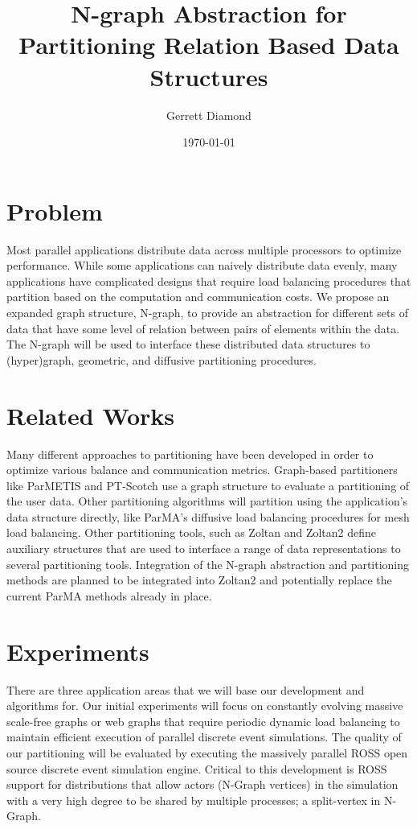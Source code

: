 \documentclass[a4paper]{article}
\title{N-graph Abstraction for Partitioning Relation Based Data Structures}
\author{Gerrett Diamond}
\date{\today}
\begin{document}
\maketitle

\section{Problem}
Most parallel applications distribute data across multiple processors to optimize performance. While some applications can naively distribute data evenly, many applications have complicated designs that require load balancing procedures that partition based on the computation and communication costs. We propose an expanded graph structure, N-graph, to provide an abstraction for different sets of data that have some level of relation between pairs of elements within the data. The N-graph will be used to interface these distributed data structures to (hyper)graph, geometric, and diffusive partitioning procedures. 

\section{Related Works}
Many different approaches to partitioning have been developed in order to optimize various balance and communication metrics. Graph-based partitioners like ParMETIS \cite{parmetis4} and PT-Scotch \cite{scotch2009} use a graph structure to evaluate a partitioning of the user data. Other partitioning algorithms will partition using the application's data structure directly, like ParMA's diffusive load balancing procedures \cite{Smith2015} for mesh load balancing. Other partitioning tools, such as Zoltan \cite{devine2002zoltan} and Zoltan2 \cite{zoltan2} define auxiliary structures that are used to interface a range of data representations to several partitioning tools. Integration of the N-graph abstraction and partitioning methods are planned to be integrated into Zoltan2 and potentially replace the current ParMA methods already in place.

\section{Experiments}
There are three application areas that we will base our development
and algorithms for. Our initial experiments will focus on
constantly evolving massive scale-free graphs or web graphs
that require periodic dynamic load balancing to maintain
efficient execution of parallel discrete event simulations. The
quality of our partitioning will be evaluated by executing the
massively parallel ROSS \cite{carothers2002ross} open source discrete event
simulation engine.  Critical to this development is ROSS support for distributions that allow actors (N-Graph vertices) in the simulation with a very high degree to be shared by multiple processes; a split-vertex in N-Graph. 
\end{document}
